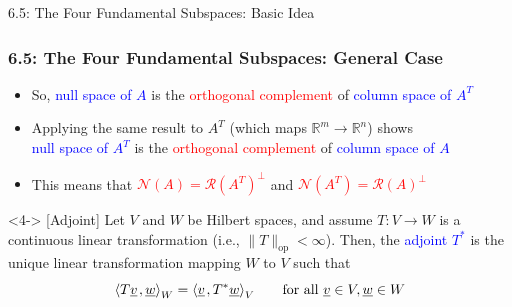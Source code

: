 \documentclass[10pt,english,aspectratio=169]{beamer}
\begin{document}
\begin{frame}{6.5: The Four Fundamental Subspaces: Basic Idea}
\begin{itemize}
\end{itemize}


\end{frame}


\begin{frame}
\frametitle{6.5: The Four Fundamental Subspaces: General Case}

\begin{itemize}
\setlength\itemsep{3mm}

\item<1-> So, \textcolor{blue}{null space of $A$} is the \textcolor{red}{orthogonal complement} of \textcolor{blue}{column space of $A^T$} 

\item<2-> Applying the same result to $A^T$ (which maps $\mathbb{R}^m \to \mathbb{R}^n$) shows \\[1.5mm] \hspace{2mm}
 \textcolor{blue}{null space of $A^T$} is the \textcolor{red}{orthogonal complement} of \textcolor{blue}{column space of $A$} 

\item<3-> This means that \textcolor{red}{$\mathcal{N}(A) = \mathcal{R}(A^T)^\perp$} and \textcolor{red}{$\mathcal{N}(A^T) = \mathcal{R}(A)^\perp$}
\end{itemize}

\begin{definition}<4-> [Adjoint]
Let $V$ and $W$ be Hilbert spaces, and assume $T \colon V \rightarrow W$ is a continuous linear transformation (i.e., $\| T \|_{\mathrm{op}} < \infty$).
Then, the \textcolor{blue}{adjoint $T^*$} is the unique linear transformation mapping $W$ to $V$ such that \vspace{-2mm}
\begin{equation*}
{\left\langle  T \underline{v}  \mskip2mu ,  \underline{w}  \right\rangle}_W
= {\left\langle  \underline{v}  \mskip2mu ,  T^* \underline{w}  \right\rangle}_V \quad\quad \text{for all }\underline{v} \in V, \underline{w} \in W
\end{equation*}


\end{definition}
\end{frame}
\end{document}
